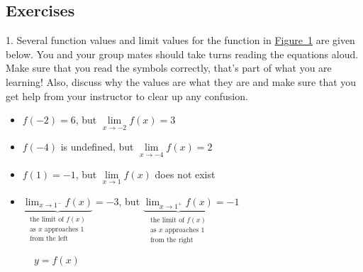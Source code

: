 \documentclass[12pt,]{book}
\theoremstyle{plain}
\theoremstyle{definition}
\theoremstyle{definition}
\theoremstyle{definition}
\theoremstyle{definition}
\theoremstyle{definition}
\numberwithin{equation}{section}
\newcommand{\fe}[2]{#1\mathopen{}\left(#2\right)\mathclose{}}
\begin{document}
\subsection[{Exercises}]{Exercises}\label{exercises-5}
\begin{exerciselist}
\item[1.]\hypertarget{exercise-46}{}Several function values and limit values for the function in \hyperref[figure-first-limit]{Figure~\ref{figure-first-limit}} are given below. You and your group mates should take turns reading the equations aloud. Make sure that you read the symbols correctly, that's part of what you are learning! Also, discuss why the values are what they are and make sure that you get help from your instructor to clear up any confusion.%
\leavevmode%
\begin{itemize}[label=\textbullet]
\item{}\(\fe{f}{-2}=6\), but \(\lim\limits_{x\to-2}\fe{f}{x}=3\)%
\item{}\(\fe{f}{-4}\) is undefined, but \(\lim\limits_{x\to-4}\fe{f}{x}=2\)%
\item{}\(\fe{f}{1}=-1\), but \(\lim\limits_{x\to1}\fe{f}{x}\) does not exist%
\item{}\(\underbrace{\lim_{x\to1^{-}}\fe{f}{x}}_{\begin{array}{c}\text{the limit of }\fe{f}{x}\\\text{as }x\text{ approaches }1\\\text{from the left}\end{array}}=-3\), but \(\underbrace{\lim_{x\to1^{+}}\fe{f}{x}}_{\begin{array}{c}\text{the limit of }\fe{f}{x}\\\text{as }x\text{ approaches }1\\\text{from the right}\end{array}}=-1\)%
\end{itemize}
\leavevmode%
\begin{figure}
\centering
{
}
\caption{\(y=\fe{f}{x}\)\label{figure-first-limit}}
\end{figure}
\par\smallskip
\end{exerciselist}
\end{document}
